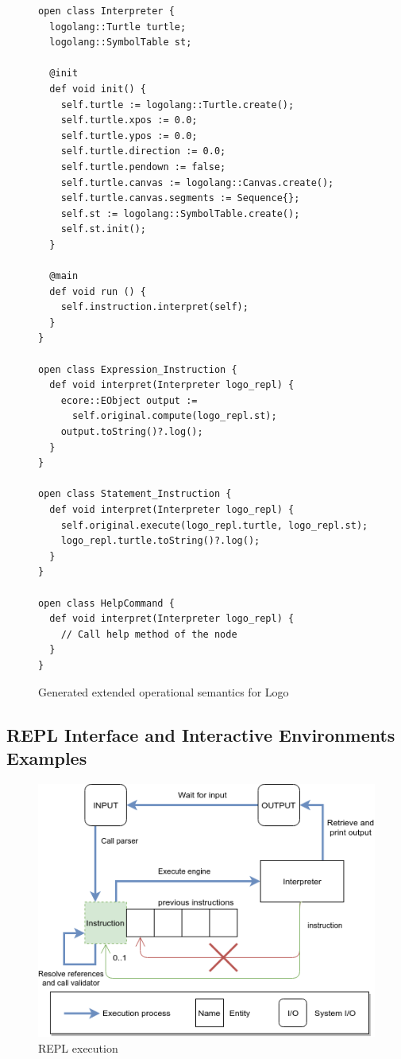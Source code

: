 \begin{figure}[t]
	\centering
\begin{lstlisting}
open class Interpreter {
  logolang::Turtle turtle;
  logolang::SymbolTable st;

  @init
  def void init() {
    self.turtle := logolang::Turtle.create();
    self.turtle.xpos := 0.0;
    self.turtle.ypos := 0.0;
    self.turtle.direction := 0.0;
    self.turtle.pendown := false;
    self.turtle.canvas := logolang::Canvas.create();
    self.turtle.canvas.segments := Sequence{};
    self.st := logolang::SymbolTable.create();
    self.st.init();
  }

  @main
  def void run () {
    self.instruction.interpret(self);
  }
}

open class Expression_Instruction {
  def void interpret(Interpreter logo_repl) {
    ecore::EObject output := 
      self.original.compute(logo_repl.st);
    output.toString()?.log();
  }  
}

open class Statement_Instruction {
  def void interpret(Interpreter logo_repl) {
    self.original.execute(logo_repl.turtle, logo_repl.st);
    logo_repl.turtle.toString()?.log();
  }
}

open class HelpCommand {
  def void interpret(Interpreter logo_repl) {
    // Call help method of the node
  }
}

	\end{lstlisting}
	\caption{Generated extended operational semantics for Logo}
	\label{fig:esementics}
\end{figure}


\subsection{REPL Interface and Interactive Environments Examples}


\begin{figure}[t]
	\centering
	\includegraphics[width=0.9\linewidth]{figures/sle_engine_wrapper.png}
	\caption{REPL execution}
	\label{fig:engine-wrapper}
\end{figure}

